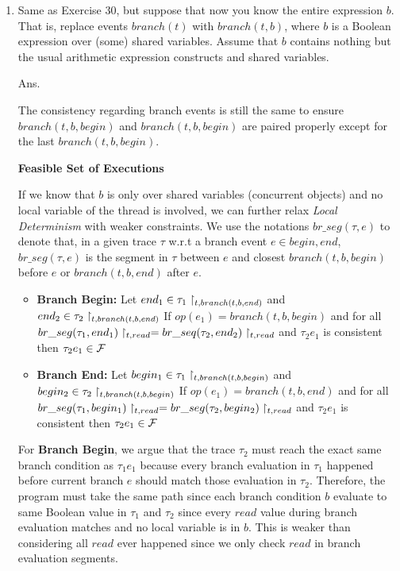 \documentclass{article}
\begin{document}
\begin{enumerate}
\item Same as Exercise 30, but suppose that now you know the entire expression $b$.
That is, replace events $branch(t)$ with $branch(t,b)$,
where $b$ is a Boolean expression over (some) shared variables.
Assume that $b$ contains nothing but the usual arithmetic expression constructs
and shared variables.

Ans.

The consistency regarding branch events is still the same to ensure $branch(t, b, begin)$
and $branch(t, b, begin)$ are paired properly except for the last $branch(t, b, begin)$.


\textbf{Feasible Set of Executions}

If we know that $b$ is only over shared variables (concurrent objects) and
no local variable of the thread is involved,
we can further relax \emph{Local Determinism} with weaker constraints.
We use the notations $br\_seg(\tau, e)$ to denote that,
in a given trace $\tau$ w.r.t a branch event $e \in {begin, end}$,
$br\_seg(\tau, e)$ is the segment in $\tau$ between $e$ and closest
$branch(t, b, begin)$ before $e$ or $branch(t, b, end)$ after $e$.

\begin{itemize}
\item \textbf{Branch Begin:}\newline
	Let $end_1 \in \tau_1\upharpoonright_{t,branch(t,b,end)}$ and
	$end_2 \in \tau_2\upharpoonright_{t,branch(t,b,end)}$\newline
	If $op(e_1) = branch(t, b, begin)$ and for all
	$br\_seg(\tau_1, end_1)\upharpoonright_{t,read} = br\_seq(\tau_2, end_2)\upharpoonright_{t,read}$
	and $\tau_2 e_1$ is consistent
	then $\tau_2 e_1 \in \mathcal{F}$
\item \textbf{Branch End:}\newline
	Let $begin_1 \in \tau_1\upharpoonright_{t,branch(t,b,begin)}$ and
	$begin_2 \in \tau_2\upharpoonright_{t,branch(t,b,begin)}$\newline
	If $op(e_1) = branch(t, b, end)$ and for all
	$br\_seg(\tau_1, begin_1)\upharpoonright_{t,read} = br\_seg(\tau_2, begin_2)\upharpoonright_{t,read}$
	and $\tau_2 e_1$ is consistent
	then $\tau_2 e_1 \in \mathcal{F}$
\end{itemize}

For \textbf{Branch Begin}, we argue that the trace $\tau_2$ must reach
the exact same branch condition as $\tau_1 e_1$ because every branch evaluation
in $\tau_1$ happened before current branch $e$ should match those evaluation in $\tau_2$.
Therefore, the program must take the same path since each branch condition $b$ 
evaluate to same Boolean value in $\tau_1$ and $\tau_2$ since every $read$ value during
branch evaluation matches and no local variable is in $b$.
This is weaker than considering all $read$ ever happened since we only check $read$ in
branch evaluation segments.
 

\end{enumerate}
\end{document}
